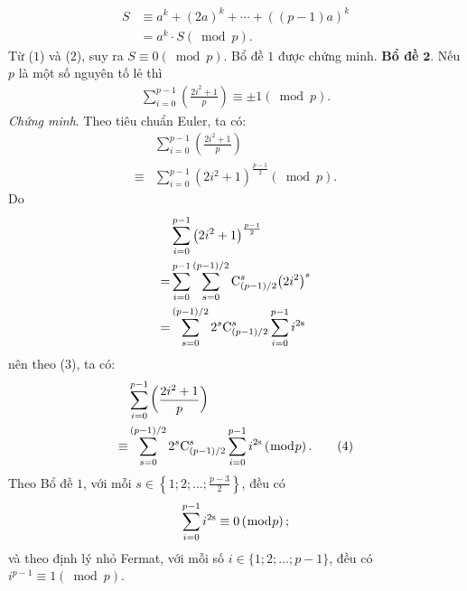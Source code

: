 \begin{multicols}{2}
	\begin{align*}
		S &\equiv {a^k} + {\left( {2a} \right)^k} +  \cdots  + {\left( {\left( {p - 1} \right)a} \right)^k} \\
		&= {a^k} \cdot S\left( {\bmod p} \right). \tag{$2$}
	\end{align*}
	Từ ($1$) và ($2$), suy ra $S \equiv 0\left( {\bmod p} \right)$.
	\vskip 0.05cm 
	Bổ đề $1$ được chứng minh.
	\vskip 0.05cm
	\textbf{\color{thachthuctoanhoc}Bổ đề} $\pmb{2.}$ Nếu $p$ là một số nguyên tố lẻ thì
	\begin{align*}
		\sum\limits_{i = 0}^{p - 1} {\left( {\frac{{2{i^2} + 1}}{p}} \right)}  \equiv  \pm 1\left( {\bmod p} \right).
	\end{align*}
	\textit{Chứng minh}. Theo tiêu chuẩn Euler, ta có:
	\begin{align*}
		&\sum\limits_{i = 0}^{p - 1} {\left( {\frac{{2{i^2} + 1}}{p}} \right)} \\ \equiv &\sum\limits_{i = 0}^{p - 1} {{{\left( {2{i^2} + 1} \right)}^{\frac{{p - 1}}{2}}}} \left( {\bmod p} \right). \tag{$3$}	
	\end{align*}
	Do
	\begin{align*}
		&\sum\limits_{i = 0}^{p - 1} {{{\left( {2{i^2} + 1} \right)}^{\frac{{p - 1}}{2}}}}  \\
		= &\sum\limits_{i = 0}^{p - 1} {\sum\limits_{s = 0}^{\left( {p - 1} \right)/2} {{\rm{C}}_{\left( {p - 1} \right)/2}^s{{\left( {2{i^2}} \right)}^s}} }  \\
		= &\sum\limits_{s = 0}^{\left( {p - 1} \right)/2} {{2^s}{\rm{C}}_{\left( {p - 1} \right)/2}^s\sum\limits_{i = 0}^{p - 1} {{i^{2{\rm{s}}}}} }
	\end{align*}
	nên theo ($3$), ta có:
	\begin{align*}
		&\sum\limits_{i = 0}^{p - 1} {\left( {\frac{{2{i^2} + 1}}{p}} \right)} \\ \equiv &\sum\limits_{s = 0}^{\left( {p - 1} \right)/2} {{2^s}{\rm{C}}_{\left( {p - 1} \right)/2}^s\sum\limits_{i = 0}^{p - 1} {{i^{2{\rm{s}}}}} } \left( {\bmod p} \right). \tag{$4$}
	\end{align*}
	Theo Bổ đề $1$, với mỗi $s \in \left\{ {1;2; \ldots ;\frac{{p - 3}}{2}} \right\}$,  đều có
	\begin{align*}
		\sum\limits_{i = 0}^{p - 1} {{i^{2{\rm{s}}}}}  \equiv 0\left( {\bmod p} \right);
	\end{align*}
	và theo định lý nhỏ Fermat, với mỗi số \linebreak$i \!\in\! \{1; 2; \!\ldots; p \!-\! 1\}$, đều có  ${i^{p \!-\! 1}} \!\equiv\! 1\left( {\bmod p} \right)$.

\end{multicols}
